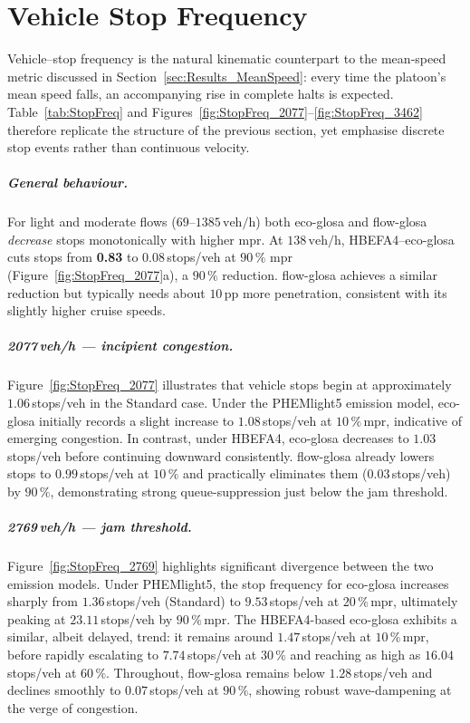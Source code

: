 \section{Vehicle Stop Frequency}
\label{sec:Results_Stops}

Vehicle–stop frequency is the natural kinematic counterpart to the mean‐speed metric discussed in Section~\ref{sec:Results_MeanSpeed}: every time the platoon’s mean speed falls, an accompanying rise in complete halts is expected. Table~\ref{tab:StopFreq} and Figures~\ref{fig:StopFreq_2077}–\ref{fig:StopFreq_3462} therefore replicate the structure of the previous section, yet emphasise discrete stop events rather than continuous velocity.

\subparagraph*{General behaviour.}
For light and moderate flows ($69$–$1385\,\mathrm{veh/h}$) both \ac{eco-glosa} and \ac{flow-glosa} \emph{decrease} stops monotonically with higher \ac{mpr}. At $138\,\mathrm{veh/h}$, HBEFA4–\ac{eco-glosa} cuts stops from \textbf{0.83} to $0.08$\,stops/veh at $90\,\%$ \ac{mpr} (Figure~\ref{fig:StopFreq_2077}a), a $90\,\%$ reduction. \ac{flow-glosa} achieves a similar reduction but typically needs about $10$\,pp more penetration, consistent with its slightly higher cruise speeds.

\subparagraph*{2077\,veh/h --- incipient congestion.}
Figure~\ref{fig:StopFreq_2077} illustrates that vehicle stops begin at approximately $1.06$\,stops/veh in the Standard case. Under the PHEMlight5 emission model, \ac{eco-glosa} initially records a slight increase to \textbf{$1.08$}\,stops/veh at $10\,\%$\,\ac{mpr}, indicative of emerging congestion. In contrast, under HBEFA4, \ac{eco-glosa} decreases to $1.03$\,stops/veh before continuing downward consistently. \ac{flow-glosa} already lowers stops to $0.99$\,stops/veh at $10\,\%$ and practically eliminates them ($0.03$\,stops/veh) by $90\,\%$, demonstrating strong queue-suppression just below the jam threshold.

\subparagraph*{2769\,veh/h --- jam threshold.}
Figure~\ref{fig:StopFreq_2769} highlights significant divergence between the two emission models. Under PHEMlight5, the stop frequency for \ac{eco-glosa} increases sharply from \textbf{$1.36$}\,stops/veh (Standard) to \textbf{$9.53$}\,stops/veh at $20\,\%$\,\ac{mpr}, ultimately peaking at \textbf{$23.11$}\,stops/veh by $90\,\%$\,\ac{mpr}. The HBEFA4-based \ac{eco-glosa} exhibits a similar, albeit delayed, trend: it remains around $1.47$\,stops/veh at $10\,\%$\,\ac{mpr}, before rapidly escalating to \textbf{$7.74$}\,stops/veh at $30\,\%$ and reaching as high as \textbf{$16.04$}\,stops/veh at $60\,\%$. Throughout, \ac{flow-glosa} remains below $1.28$\,stops/veh and declines smoothly to $0.07$\,stops/veh at $90\,\%$, showing robust wave-dampening at the verge of congestion.

